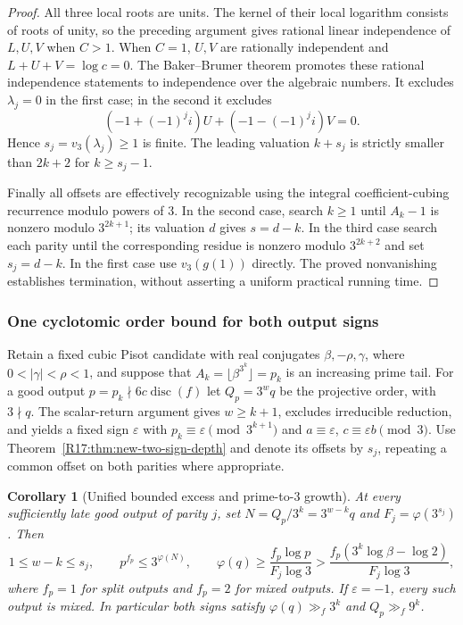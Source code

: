 \documentclass[11pt,a4paper]{article}
\newtheorem{corollary}[theorem]{Corollary}\newtheorem{mainthm}[theorem]{Theorem}
\theoremstyle{definition}\newtheorem{definition}[theorem]{Definition}
\theoremstyle{remark}\newtheorem{remark}[theorem]{Remark}
\begin{document}
\begin{proof}
All three local roots are units. The kernel of their local logarithm
consists of roots of unity, so the preceding argument gives rational
linear independence of $L,U,V$ when $C>1$. When $C=1$, $U,V$ are
rationally independent and $L+U+V=\log c=0$.
The Baker--Brumer theorem \cite[Theorem~2.1]{R17-Maksoud} promotes these rational independence
statements to independence over the algebraic numbers. It excludes
$\lambda_j=0$ in the first case; in the second it excludes
\[
 (-1+(-1)^ji)U+(-1-(-1)^ji)V=0.
\]
Hence $s_j=v_3(\lambda_j)\ge1$ is finite. The leading valuation
$k+s_j$ is strictly smaller than $2k+2$ for $k\ge s_j-1$.

Finally all offsets are effectively recognizable using the integral
coefficient-cubing recurrence modulo powers of $3$. In the second case,
search $k\ge1$ until $A_k-1$ is nonzero modulo $3^{2k+1}$; its
valuation $d$ gives $s=d-k$. In the third case search each parity
until the corresponding residue is nonzero modulo $3^{2k+2}$ and
set $s_j=d-k$. In the first case use $v_3(g(1))$ directly.
The proved nonvanishing establishes termination, without asserting a
uniform practical running time.
\end{proof}

\subsubsection{One cyclotomic order bound for both output signs}

Retain a fixed cubic Pisot candidate with real conjugates
$\beta,-\rho,\gamma$, where $0<|\gamma|<\rho<1$, and suppose that
$A_k=\lfloor\beta^{3^k}\rfloor=p_k$ is an increasing prime tail.
For a good output $p=p_k\nmid6c\operatorname{disc}(f)$ let
$Q_p=3^wq$ be the projective order, with $3\nmid q$.
The scalar-return argument gives $w\ge k+1$, excludes irreducible
reduction, and yields a fixed sign $\varepsilon$ with
$p_k\equiv\varepsilon\pmod{3^{k+1}}$ and
$a\equiv\varepsilon$, $c\equiv\varepsilon b\pmod3$.
Use Theorem~\ref{R17:thm:new-two-sign-depth} and denote its offsets by
$s_j$, repeating a common offset on both parities where appropriate.

\begin{corollary}[Unified bounded excess and prime-to-$3$ growth]
\label{R17:cor:new-two-sign-order}
At every sufficiently late good output of parity $j$, set
$N=Q_p/3^k=3^{w-k}q$ and $F_j=\varphi(3^{s_j})$.
Then
\[
 1\le w-k\le s_j,\qquad
 p^{f_p}\le3^{\varphi(N)},\qquad
 \varphi(q)\ge\frac{f_p\log p}{F_j\log3}
 >\frac{f_p(3^k\log\beta-\log2)}{F_j\log3},
\]
where $f_p=1$ for split outputs and $f_p=2$ for mixed outputs.
If $\varepsilon=-1$, every such output is mixed. In particular both
signs satisfy $\varphi(q)\gg_f3^k$ and $Q_p\gg_f9^k$.
\end{corollary}
\end{document}
